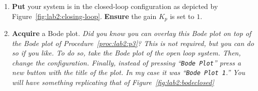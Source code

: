 \begin{procedure}[label={proc:lab2:p4}]
  \begin{enumerate}[label=(\arabic*)]
    \item{
      \textbf{Put} your system is in the closed-loop configuration as
      depicted by Figure~\ref{fig:lab2:closing-loop}.
      \textbf{Ensure} the gain \(K_p\) is set to \(1.\)
    }
    \item{
      \textbf{Acquire} a Bode plot. \emph{Did you know you can overlay
      this Bode plot on top of the Bode plot of Procedure~\ref{proc:lab2:p3}?
      This is not required, but you can do so if you like.
      To do so, take the Bode plot of the open loop system. Then, change the
      configuration. Finally, instead of pressing ``\texttt{Bode Plot}'' press
      a new button with the title of the plot. In my case it was
      ``\texttt{Bode Plot 1}.'' You will have something replicating that of
      Figure~\ref{fig:lab2:bodeclosed}}
    }
  \end{enumerate}
\end{procedure}
%
